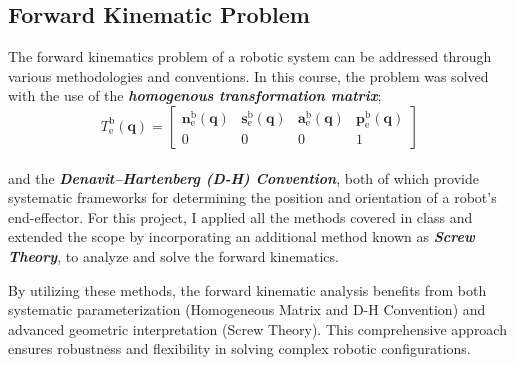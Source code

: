 \documentclass[12pt]{report}
\begin{document}
	\subsection{Forward Kinematic Problem}
The forward kinematics problem of a robotic system can be addressed through various methodologies and conventions. In this course, the problem was solved with the use of the \textbf{\emph{homogenous transformation matrix}};
	\begin{equation} 
	T^\mathrm{b}_\mathrm{e}(\mathbf{q}) = 
	\begin{bmatrix}
		\mathbf{n}^\mathrm{b}_\mathrm{e}(\mathbf{q}) & \mathbf{s}^\mathrm{b}_\mathrm{e}(\mathbf{q}) & \mathbf{a}^\mathrm{b}_\mathrm{e}(\mathbf{q}) & \mathbf{p}^\mathrm{b}_\mathrm{e}(\mathbf{q}) \\
		0 & 0 & 0 & 1
	\end{bmatrix}
\end{equation}
\\and the \textbf{\emph{Denavit–Hartenberg (D-H) Convention}}, both of which provide systematic frameworks for determining the position and orientation of a robot's end-effector. For this project, I applied all the methods covered in class and extended the scope by incorporating an additional method known as \textbf{\emph{Screw Theory}}, to analyze and solve the forward kinematics. 


By utilizing these methods, the forward kinematic analysis benefits from both systematic parameterization (Homogeneous Matrix and D-H Convention) and advanced geometric interpretation (Screw Theory). This comprehensive approach ensures robustness and flexibility in solving complex robotic configurations.
\end{document}
